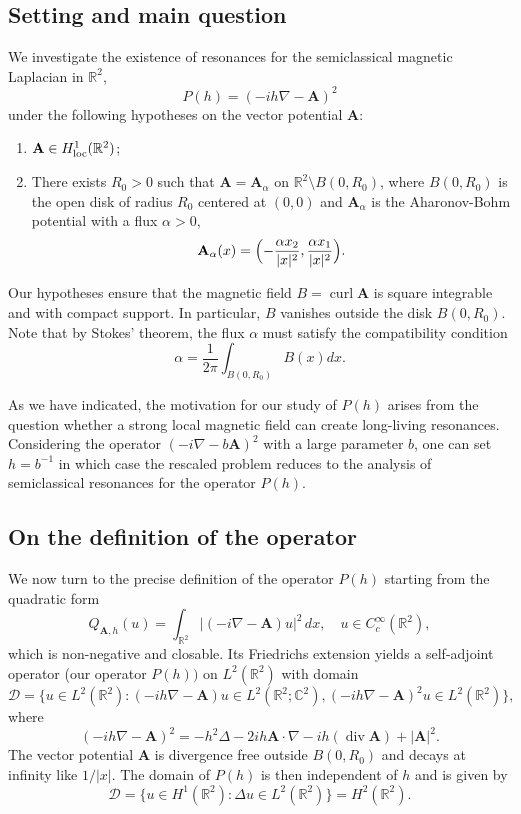 \documentclass[11pt]{amsart}
\theoremstyle{remark}
\newcommand{\bA}{\mathbf{A}}
\newcommand{\R}{\mathbb{R}}
\DeclareMathOperator{\Div}{div}
\DeclareMathOperator{\Curl}{curl}
\numberwithin{equation}{section}
\begin{document}
\subsection{Setting and main question}
We investigate the existence of resonances for the semiclassical magnetic Laplacian in $\mathbb R^2$, 
\begin{equation}\label{eq:def-ml}
P(h)=(-ih\nabla-\bA)^2
\end{equation}
under the following hypotheses on the vector potential $\bA$:
\begin{enumerate}
    \item $\bA\in H^1_{\rm loc}(\mathbb R^2)$;
    \item There exists $R_0>0$ such that $\bA=\bA_\alpha$ on $\mathbb R^2\setminus B(0,R_0)$, where $B(0,R_0)$ is the open disk of radius $R_0$ centered at $(0,0)$ and $\bA_\alpha$ is the Aharonov-Bohm potential with a flux $\alpha>0$,
\begin{equation}\label{eq:def-AB}
\bA_\alpha (x)=\Bigl(-\frac{\alpha x_2}{|x|^2},\frac{\alpha x_1}{|x|^2}\Bigr).
\end{equation}
\end{enumerate}
Our hypotheses ensure that the magnetic field $B=\Curl\bA$ is square integrable and with compact support. In particular,  $B$ vanishes outside the disk $B(0,R_0)$. Note that by Stokes' theorem, the flux $\alpha$ must satisfy the compatibility condition
\begin{equation}\label{eq:cond-alpha}
\alpha=\frac1{2\pi}\int_{B(0,R_0)}B(x)dx.
\end{equation}

As we have indicated, the motivation for our study of $P(h)$ arises from the question whether a strong local magnetic field can create long-living resonances. Considering the operator $(-i\nabla - b\bA)^2$ with a large parameter $b$, one can set $h = b^{-1}$ in which case the rescaled problem reduces to the analysis of semiclassical resonances for the operator $P(h)$.\medskip


\subsection{On the definition of the operator}

We now turn to the precise definition of the operator $P(h)$ starting from the quadratic form
\[
Q_{\bA,h}(u) = \int_{\R^2} |(-i\nabla - \bA)u|^2 \, dx, \quad u \in C_c^\infty(\R^2),
\]
which is non-negative and closable. Its Friedrichs extension yields a self-adjoint operator (our operator $P(h))$  on $L^2(\R^2)$ with domain
\[\mathcal D=\{u\in L^2(\R^2)\colon (-ih\nabla-\bA)u\in L^2(\R^2;\mathbb C^2),(-ih\nabla-\bA)^2u\in L^2(\R^2)\},\]
where 
\[(-ih\nabla-\bA)^2=-h^2\Delta-2i h\bA\cdot\nabla-ih(\Div \bA) +|\bA|^2.\] 
The vector potential $\bA$ is divergence free outside $B(0,R_0)$ and decays at infinity like $1/|x|$. The domain of $P(h)$ is then independent of $h$ and is given by
\begin{equation}\label{eq:Domain-H}
\mathcal D=\{u\in H^1(\R^2)\colon \Delta u\in L^2(\R^2)\}=H^2(\R^2).
\end{equation}
\end{document}
